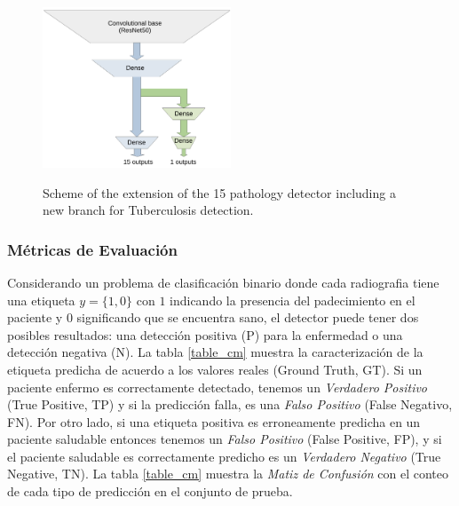 {\begin{figure}[htp]
    \centering
    {\includegraphics[width=0.5\textwidth]{Chapters/4. ViT-Lung/images/tb_net.pdf}}
\caption{Scheme of the extension of the 15 pathology detector including a new branch for Tuberculosis detection.}
\label{net_tb}
\end{figure}


\subsubsection{Métricas de Evaluación}

Considerando un problema de clasificación binario donde cada radiografia tiene una etiqueta
$y = \{1, 0\}$ con $1$ indicando la presencia del padecimiento en el paciente y $0$ significando
que se encuentra sano, el detector puede tener dos posibles resultados: una detección positiva (P)
para la enfermedad o una detección negativa (N). La tabla \ref{table_cm} muestra la caracterización
de la etiqueta predicha de acuerdo a los valores reales (Ground Truth, GT). Si un paciente enfermo
es correctamente detectado, tenemos un \textit{Verdadero Positivo} (True Positive, TP) y si la
predicción falla, es una \textit{Falso Positivo} (False Negativo, FN). Por otro lado, si una etiqueta
positiva es erroneamente predicha en un paciente saludable entonces tenemos un \textit{Falso Positivo}
(False Positive, FP), y si el paciente saludable es correctamente predicho es un
\textit{Verdadero Negativo} (True Negative, TN). La tabla \ref{table_cm} muestra la \textit{Matiz de
Confusión} con el conteo de cada tipo de predicción en el conjunto de prueba.

}
